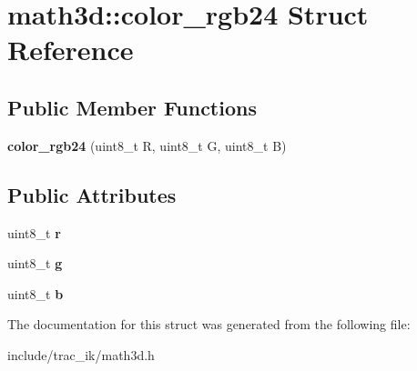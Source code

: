 \section{math3d\-:\-:color\-\_\-rgb24 Struct Reference}
\label{structmath3d_1_1color__rgb24}
\subsection*{Public Member Functions}
\begin{DoxyCompactItemize}
\item 
{\bfseries color\-\_\-rgb24} (uint8\-\_\-t R, uint8\-\_\-t G, uint8\-\_\-t B)\label{structmath3d_1_1color__rgb24_a98c61e71b0e296759d62b009cfe46649}

\end{DoxyCompactItemize}
\subsection*{Public Attributes}
\begin{DoxyCompactItemize}
\item 
uint8\-\_\-t {\bfseries r}\label{structmath3d_1_1color__rgb24_adf9c15dc5dfe4e70c37aa1ecc9e1d41a}

\item 
uint8\-\_\-t {\bfseries g}\label{structmath3d_1_1color__rgb24_a1ccc0a7eb966af426106962f44a46591}

\item 
uint8\-\_\-t {\bfseries b}\label{structmath3d_1_1color__rgb24_a4f4865aadcd647fd6799c61817e8d865}

\end{DoxyCompactItemize}


The documentation for this struct was generated from the following file\-:\begin{DoxyCompactItemize}
\item 
include/trac\-\_\-ik/math3d.\-h\end{DoxyCompactItemize}
